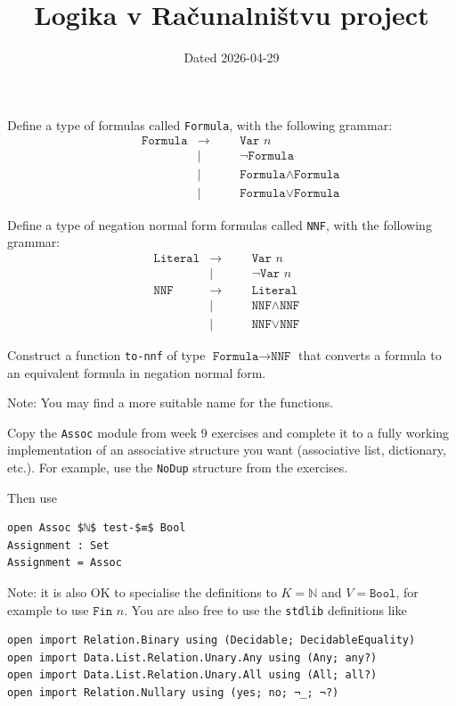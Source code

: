 \documentclass{article}
\title{Logika v Računalništvu project}
\date{Dated 2026-04-29}
\def\formula{\texttt{Formula}}
\def\nnf{\texttt{NNF}}
\def\var{\texttt{Var }}
\def\tonnf{\texttt{to-nnf}}
\def\bool{\texttt{Bool}}
\def\fin{\texttt{Fin }}
\def\lit{\texttt{Literal}}
\begin{document}
\maketitle


\begin{problem}[*]
  Define a type of formulas called \formula, with the following grammar:
  \begin{align*}
    &&&&&&&&&&&&&\formula &→&&& \var n&&&&&&&&&&&&\\
    &&&&&&&&&&&&&         &|&&& \neg \formula&&&&&&&&&&&&\\
    &&&&&&&&&&&&&         &|&&& \formula ∧ \formula&&&&&&&&&&&&\\
    &&&&&&&&&&&&&         &|&&& \formula ∨ \formula&&&&&&&&&&&&
  \end{align*}
\end{problem}


\begin{problem}[*]
  Define a type of negation normal form formulas called \nnf, with the following grammar:
  \begin{align*}
    &&&&&&&&&&&\lit &→&&& \var n&&&&&&&&&&&&\\
    &&&&&&&&&&&     &|&&& ¬ \var n&&&&&&&&&&&&\\
    &&&&&&&&&&&\nnf &→&&& \lit&&&&&&&&&&&&\\
    &&&&&&&&&&&     &|&&& \nnf ∧ \nnf&&&&&&&&&&&&\\
    &&&&&&&&&&&     &|&&& \nnf ∨ \nnf&&&&&&&&&&&&
  \end{align*}
\end{problem}

\begin{problem}[*]
  Construct a function \tonnf{} of type \(\formula → \nnf\) that converts a formula to an equivalent formula in negation normal form.

  Note: You may find a more suitable name for the functions.
\end{problem}


\begin{problem}[**]
  Copy the \texttt{Assoc} module from week 9 exercises and complete it to a fully working implementation of an associative structure you want (associative list, dictionary, etc.). For example, use the \texttt{NoDup} structure from the exercises.

  Then use
\begin{Verbatim}[breaklines, breakanywhere, mathescape, codes={\catcode`_=12}]
open Assoc $ℕ$ test-$≡$ Bool
Assignment : Set
Assignment = Assoc
\end{Verbatim}

  Note: it is also OK to specialise the definitions to \(K = ℕ\) and \(V = \bool\), for example to use \(\fin n\).
  You are also free to use the \texttt{stdlib} definitions like
\begin{Verbatim}[breaklines, breakanywhere, mathescape, codes={\catcode`_=12}]
open import Relation.Binary using (Decidable; DecidableEquality)
open import Data.List.Relation.Unary.Any using (Any; any?)
open import Data.List.Relation.Unary.All using (All; all?)
open import Relation.Nullary using (yes; no; ¬_; ¬?)
\end{Verbatim}
\end{problem}
\end{document}
